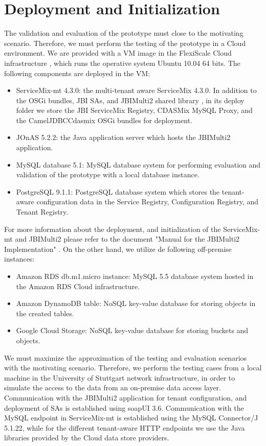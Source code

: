 \section{Deployment and Initialization}
\label{sec:deploymentandinit}

The validation and evaluation of the prototype must close to the motivating scenario. Therefore, we must perform the testing of the prototype in a Cloud environment. We are provided with a VM image in the FlexiScale Cloud infrastructure \cite{flexiscale}, which runs the operative system Ubuntu 10.04 64 bits. The following components are deployed in the VM:
\begin{itemize}
	\item ServiceMix-mt 4.3.0: the multi-tenant aware ServiceMix 4.3.0. In addition to the \ac{OSGi} bundles, \ac{JBI} \ac{SA}s, and JBIMulti2 shared library \cite{JBIMulti2Man}, in its deploy folder we store the \ac{JBI} ServiceMix Registry, CDASMix MySQL Proxy, and the CamelJDBCCdasmix \ac{OSGi} bundles for deployment. 
	\item JOnAS 5.2.2: the Java application server which hosts the JBIMulti2 application. 
	\item MySQL database 5.1: MySQL database system for performing evaluation and validation of the prototype with a local database instance.
	\item PostgreSQL 9.1.1:  PostgreSQL database system which stores the tenant-aware configuration data in the Service Registry, Configuration Registry, and Tenant Registry. 
\end{itemize} 

For more information about the deployment, and initialization of the ServiceMix-mt and JBIMulti2 please refer to the document "Manual for the JBIMulti2 Implementation" \cite{JBIMulti2Man}. On the other hand, we utilize de following off-premise instances:
\begin{itemize}
	\item Amazon RDS db.m1.micro instance: MySQL 5.5 database system hosted in the Amazon RDS Cloud infrastructure. 
	\item Amazon DynamoDB table: \ac{NoSQL} key-value database for storing objects in the created tables. 
	\item Google Cloud Storage: \ac{NoSQL} key-value database for storing buckets and objects.
\end{itemize} 

We must maximize the approximation of the testing and evaluation scenarios with the motivating scenario. Therefore, we perform the testing cases from a local machine in the University of Stuttgart network infrastructure, in order to simulate the access to the data from an on-premise data access layer. Communication with the JBIMulti2 application for tenant configuration, and deployment of \ac{SA}s is established using soapUI 3.6. Communication with the MySQL endpoint in ServiceMix-mt is established using the MySQL Connector/J 5.1.22, while for the different tenant-aware \ac{HTTP} endpoints we use the Java libraries provided by the Cloud data store providers. 